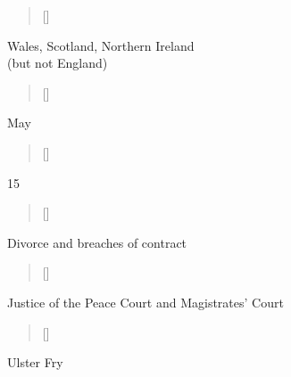 \documentclass[grid,avery5371]{flashcards}
\begin{document}
\begin{flashcard}[]{%
\begin{verse}[\versewidth]
\end{verse}}

Wales, Scotland, Northern Ireland \\ (but not England)

\end{flashcard}

\begin{flashcard}[]{%
\begin{verse}[\versewidth]
\end{verse}}

May

\end{flashcard}

\begin{flashcard}[]{%
\begin{verse}[\versewidth]
\end{verse}}

15

\end{flashcard}

\begin{flashcard}[]{%
\begin{verse}[\versewidth]
\end{verse}}

Divorce and breaches of contract

\end{flashcard}

\begin{flashcard}[]{%
\begin{verse}[\versewidth]
\end{verse}}

Justice of the Peace Court and Magistrates' Court

\end{flashcard}

\begin{flashcard}[]{%
\begin{verse}[\versewidth]
\end{verse}}

Ulster Fry

\end{flashcard}
\end{document}
